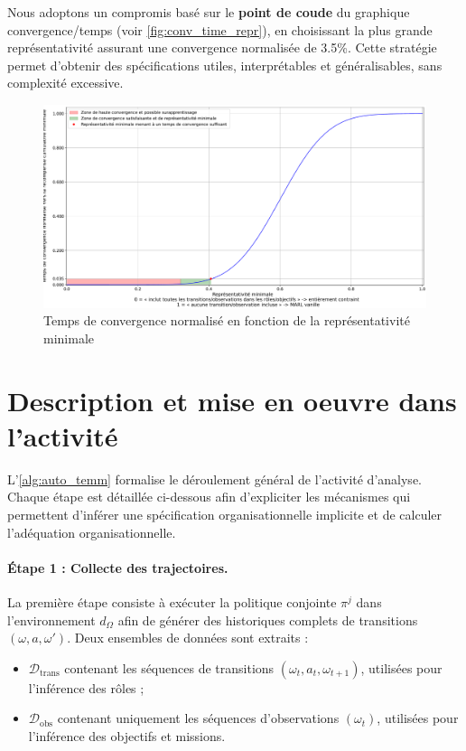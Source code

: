 Nous adoptons un compromis basé sur le \textbf{point de coude} du graphique convergence/temps (voir \autoref{fig:conv_time_repr}), en choisissant la plus grande représentativité assurant une convergence normalisée de 3.5\%. Cette stratégie permet d'obtenir des spécifications utiles, interprétables et généralisables, sans complexité excessive.

\begin{figure}[h!]
  \centering
  \includegraphics[trim=0cm 0cm 0cm 0cm, clip, width=1.\linewidth]{figures/convergence_time_relative_to_representativeness.pdf}
  \caption{Temps de convergence normalisé en fonction de la représentativité minimale}
  \label{fig:conv_time_repr}
\end{figure}




\section{Description et mise en oeuvre dans l'activité}

L'\autoref{alg:auto_temm} formalise le déroulement général de l'activité d'analyse.
Chaque étape est détaillée ci-dessous afin d'expliciter les mécanismes qui permettent d'inférer une spécification organisationnelle implicite et de calculer l'adéquation organisationnelle.

\paragraph{Étape 1 : Collecte des trajectoires.}
La première étape consiste à exécuter la politique conjointe $\pi^j$ dans l'environnement $d_\Omega$ afin de générer des historiques complets de transitions $(\omega, a, \omega')$.
Deux ensembles de données sont extraits :
\begin{itemize}
  \item $\mathcal{D}_{\text{trans}}$ contenant les séquences de transitions $(\omega_t, a_t, \omega_{t+1})$, utilisées pour l'inférence des rôles ;
  \item $\mathcal{D}_{\text{obs}}$ contenant uniquement les séquences d'observations $(\omega_t)$, utilisées pour l'inférence des objectifs et missions.
\end{itemize}

